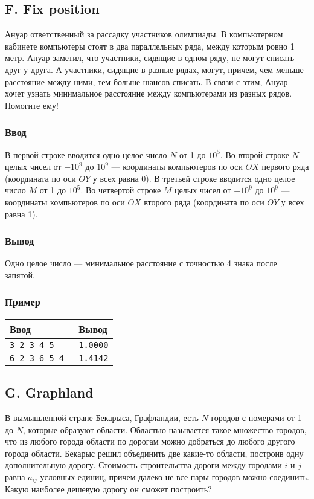 \documentclass[10pt, a4paper]{article}
\newcommand{\informat}[1]
{
	\subsubsection*{Ввод} #1
}
\newcommand{\outformat}[1]
{
	\subsubsection*{Вывод} #1
}
\newcommand{\examplee}[4]
{
	\subsubsection*{Пример}
	\noindent
	\begin{center}
	\begin{tabularx}{\linewidth}{|X|X|}
	\hline
	Ввод 	& Вывод  	\\
	\hline
	{\tt #1} & {\tt #2}	\\
	\hline
	{\tt #3} & {\tt #4}	\\
	\hline
	\end{tabularx}
	\end{center}
}
\begin{document}
\subsection*{F. Fix position}


Ануар ответственный за рассадку участников олимпиады. В компьютерном кабинете компьютеры стоят в два параллельных ряда, между которым ровно 1 метр. Ануар заметил, что участники, сидящие в одном ряду, не могут списать друг у друга. А участники, сидящие в разные рядах, могут, причем, чем меньше расстояние между ними, тем больше шансов списать. В связи с этим, Ануар хочет узнать минимальное расстояние между компьютерами из разных рядов. Помогите ему!

\informat{В первой строке вводится одно целое число $N$ от 1 до $10^5$. \newline 
Во второй строке $N$ целых чисел от $-10^9$ до $10^9$ --- координаты компьютеров по оси $OX$ первого ряда (координата по оси $OY$ у всех равна 0). \newline
В третьей строке вводится одно целое число $M$ от 1 до $10^5$. \newline
Во четвертой строке $M$ целых чисел от $-10^9$ до $10^9$ --- координаты компьютеров по оси $OX$ второго ряда (координата по оси $OY$ у всех равна 1).}

\outformat{Одно целое число --- минимальное расстояние с точностью 4 знака после запятой.}

\examplee
{3 \newline
1 2 3 \newline
3 \newline
3 4 5}
{1.0000}
{6 \newline
1 2 3 6 5 4 \newline
1 \newline
0}
{1.4142}



\subsection*{G. Graphland}


В вымышленной стране Бекарыса, Графландии, есть $N$ городов с номерами от 1 до $N$, которые образуют области. Областью называется такое множество городов, что из любого города области по дорогам можно добраться до любого другого города области. Бекарыс решил объединить две какие-то области, построив одну дополнительную дорогу. Стоимость строительства дороги между городами $i$ и $j$ равна $a_{ij}$ условных единиц, причем далеко не все пары городов можно соединить. Какую наиболее дешевую дорогу он сможет построить?
\end{document}
